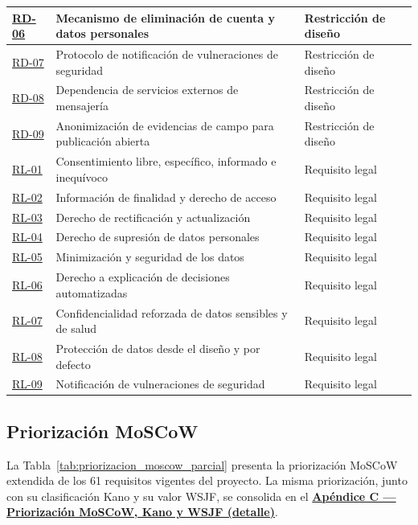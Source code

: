 \documentclass[journal,onecolumn]{IEEEtran}
\begin{document}
\begin{longtable}{@{}p{2.2cm} p{7.5cm} p{3.5cm}@{}}
		\hline
		\hyperref[tab:RD-06]{RD-06} & Mecanismo de eliminación de cuenta y datos personales & Restricción de diseño \\
		\hline
		\hyperref[tab:RD-07]{RD-07} & Protocolo de notificación de vulneraciones de seguridad & Restricción de diseño \\
		\hline
		\hyperref[tab:RD-08]{RD-08} & Dependencia de servicios externos de mensajería & Restricción de diseño \\
		\hline
		\hyperref[tab:RD-09]{RD-09} & Anonimización de evidencias de campo para publicación abierta & Restricción de diseño \\
		\hline
		\hyperref[rl:01]{RL-01} & Consentimiento libre, específico, informado e inequívoco & Requisito legal \\
		\hline
		\hyperref[rl:02]{RL-02} & Información de finalidad y derecho de acceso & Requisito legal \\
		\hline
		\hyperref[rl:03]{RL-03} & Derecho de rectificación y actualización & Requisito legal \\
		\hline
		\hyperref[rl:04]{RL-04} & Derecho de supresión de datos personales & Requisito legal \\
		\hline
		\hyperref[rl:05]{RL-05} & Minimización y seguridad de los datos & Requisito legal \\
		\hline
		\hyperref[rl:06]{RL-06} & Derecho a explicación de decisiones automatizadas & Requisito legal \\
		\hline
		\hyperref[rl:07]{RL-07} & Confidencialidad reforzada de datos sensibles y de salud & Requisito legal \\
		\hline
		\hyperref[rl:08]{RL-08} & Protección de datos desde el diseño y por defecto & Requisito legal \\
		\hline
		\hyperref[rl:09]{RL-09} & Notificación de vulneraciones de seguridad & Requisito legal \\
	\end{longtable}
	
	\newpage
	
	\subsection{Priorización MoSCoW}
	\label{sec:moscow}
	
	La Tabla~\ref{tab:priorizacion_moscow_parcial} presenta la priorización
	MoSCoW extendida de los 61 requisitos vigentes del proyecto. La misma
	priorización, junto con su clasificación Kano y su valor WSJF, se
	consolida en el
	\textbf{\hyperref[tab:priorizacion_moscow_completa]{Apéndice C --- Priorización
			MoSCoW, Kano y WSJF (detalle)}}.
	
\end{document}
